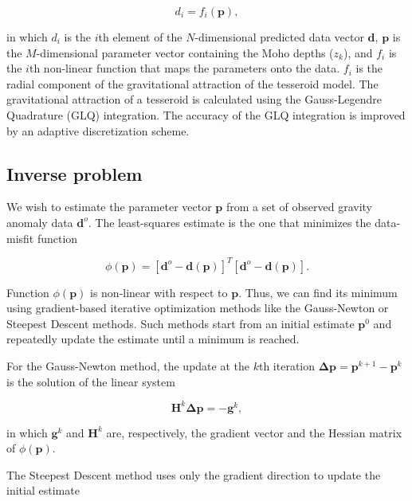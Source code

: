 \documentclass[extra,mreferee]{gji}
\begin{document}
\begin{equation}
    d_i = f_i(\mathbf{p}),
\end{equation}

\noindent in which $d_i$ is the $i$th element of the $N$-dimensional predicted
data vector $\mathbf{d}$, $\mathbf{p}$ is the $M$-dimensional parameter vector
containing the Moho depths ($z_k$),
and $f_i$ is the $i$th non-linear function that maps the parameters onto the
data.
$f_i$ is the radial component of the gravitational attraction of the tesseroid
model.
The gravitational attraction of a tesseroid is calculated using the
Gauss-Legendre Quadrature (GLQ) integration.
The accuracy of the GLQ integration is improved by an adaptive discretization
scheme.


\subsection{Inverse problem}

We wish to estimate the parameter vector $\mathbf{p}$ from a set of observed
gravity anomaly data $\mathbf{d}^o$.
The least-squares estimate is the one that minimizes the data-misfit function

\begin{equation}
    \phi(\mathbf{p}) =
    [\mathbf{d}^o - \mathbf{d}(\mathbf{p})]^T[\mathbf{d}^o - \mathbf{d}(\mathbf{p})].
    \label{eq:data-misfit}
\end{equation}

Function $\phi(\mathbf{p})$ is non-linear with respect to $\mathbf{p}$.
Thus, we can find its minimum using gradient-based
iterative optimization
methods like the Gauss-Newton or Steepest Descent methods.
Such methods start from an initial estimate $\mathbf{p}^0$ and repeatedly update
the estimate until a minimum is reached.

For the Gauss-Newton method,
the update at the $k$th iteration $\mathbf{\Delta p} = \mathbf{p}^{k+1} - \mathbf{p}^k$
is the solution of the linear system

\begin{equation}
    \mathbf{H}^k\mathbf{\Delta p} = -\mathbf{g}^k,
    \label{eq:gaussnewton}
\end{equation}

\noindent in which
$\mathbf{g}^k$ and $\mathbf{H}^k$ are, respectively,
the gradient vector and the Hessian matrix of $\phi(\mathbf{p})$.

The Steepest Descent method uses only the gradient direction
to update the initial estimate
\end{document}
